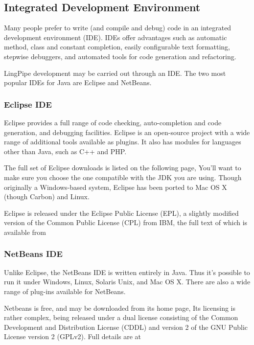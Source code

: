 \subsection{Integrated Development Environment}

Many people prefer to write (and compile and debug) code in an
integrated development environment (IDE).  IDEs offer advantages such
as automatic method, class and constant completion, easily
configurable text formatting, stepwise debuggers, and automated tools
for code generation and refactoring.

LingPipe development may be carried out through an IDE.  The two most
popular IDEs for Java are Eclipse and NetBeans.

\subsubsection{Eclipse IDE}

Eclipse provides a full range of code checking, auto-completion
and code generation, and debugging facilities.  Eclipse is an open-source
project with a wide range of additional tools available as plugins.  It
also has modules for languages other than Java, such as C++ and PHP.

The full set of Eclipse downloads is listed on the following page,
%
%
You'll want to make sure you choose the one compatible with the JDK
you are using.  Though originally a Windows-based system, Eclipse has been
ported to Mac OS X (though Carbon) and Linux.  

Eclipse is released under the Eclipse Public License (EPL), a slightly modified
version of the Common Public License (CPL) from IBM, the full text of which is
available from
%


\subsubsection{NetBeans IDE}

Unlike Eclipse, the NetBeans IDE is written entirely in Java.  Thus
it's possible to run it under Windows, Linux, Solaris Unix, and Mac OS
X. There are also a wide range of plug-ins available for NetBeans.

Netbeans is free, and may be downloaded from its home page,
%
%
Its licensing is rather complex, being released under a dual license
consisting of the Common Development and Distribution License (CDDL)
and version 2 of the GNU Public License version 2 (GPLv2).  Full details
are at
%


